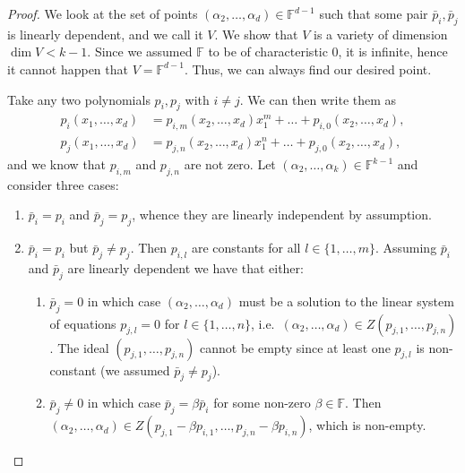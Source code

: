 \documentclass{amsart}
\theoremstyle{definition}
\theoremstyle{remark}
\numberwithin{equation}{section}
\newcommand{\F}{\mathbb{F}}
\begin{document}
\begin{proof}
	We look at the set of points $ (\alpha_2, \ldots, \alpha_d) \in \F^{d-1} $ such
	that some pair $ \bar{p}_i, \bar{p}_j $ is linearly dependent, and we call it $ V
	$. We show that $ V $ is a variety of dimension $ \dim V < k-1 $. Since we
	assumed $ \F $ to be of characteristic $ 0 $, it is infinite, hence
	it cannot happen that $ V = \F^{d-1} $. Thus, we can always find our desired
	point.

	Take any two polynomials $ p_i, p_j $ with $ i\neq j $. We can then write them as
	\begin{align*}
		p_i(x_1, \ldots, x_d) &= p_{i,m}(x_2, \ldots, x_d)x_1^m + \ldots +
		p_{i,0}(x_2, \ldots, x_d),\\
		p_j(x_1, \ldots, x_d) &= p_{j,n}(x_2, \ldots, x_d)x_1^n + \ldots +
		p_{j,0}(x_2, \ldots, x_d),
	\end{align*}
	and we know that $ p_{i,m} $ and $ p_{j,n} $ are not zero. Let $ (\alpha_2,
	\ldots, \alpha_k) \in \F^{k-1}$ and consider three cases:	
	\begin{enumerate}
		\item
			$ \bar{p}_i = p_i $ and $ \bar{p}_j = p_j $, whence they are linearly
		independent by assumption.
		 \item
			 $ \bar{p}_i = p_i $ but $ \bar{p}_j \neq p_j $. Then $ p_{i,l} $ are
			 constants for all $ l \in \{1, \ldots, m\} $. Assuming $ \bar{p}_i
			 $ and $ \bar{p}_j $ are linearly dependent we have that either:
			 \begin{enumerate}
			 	\item
					 $ \bar{p}_j = 0 $ in which case $ (\alpha_2, \ldots, \alpha_d) $ must
					 be a solution to the linear system of equations $ p_{j, l} = 0 $ for $ l
					 \in \{1, \ldots, n\} $, i.e.\ $ (\alpha_2, \ldots, \alpha_d) \in
					 Z(p_{j,1}, \ldots, p_{j, n}) $. The ideal $ (p_{j,1}, \ldots, p_{j,
					 n}) $ cannot be empty since at least one $ p_{j,l} $ is
					 non-constant (we assumed $ \bar{p}_j \neq p_j $).

				\item
					$ \bar{p}_j \neq 0 $ in which case $ \bar{p}_j = \beta
					\bar{p}_i $ for some non-zero $ \beta \in \F $. Then $
					(\alpha_2, \ldots, \alpha_d) \in Z(p_{j, 1} - \beta p_{i,
					1}, \ldots, p_{j, n} - \beta p_{i, n})$, which is non-empty.
			 \end{enumerate} 


\end{enumerate}
\end{proof}
\end{document}
